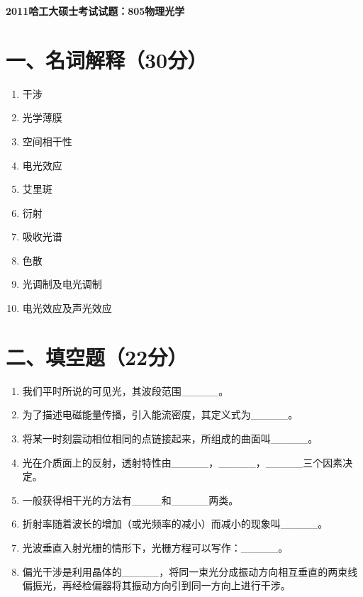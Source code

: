 \documentclass[12pt, a4paper]{article}
\theoremstyle{solution}
\begin{document}
\begin{center}
\Large\textbf{2011哈工大硕士考试试题：805物理光学}
\end{center}





\section*{一、名词解释（30分）}
\begin{enumerate}
    \item 干涉
    \item 光学薄膜
    \item 空间相干性
    \item 电光效应
    \item 艾里斑
    \item 衍射
    \item 吸收光谱
    \item 色散
    \item 光调制及电光调制
    \item 电光效应及声光效应
\end{enumerate}
\section*{二、填空题（22分）}
\begin{enumerate}
    \item 我们平时所说的可见光，其波段范围\_\_\_\_\_。
    \item 为了描述电磁能量传播，引入能流密度，其定义式为\_\_\_\_\_。
    \item 将某一时刻震动相位相同的点链接起来，所组成的曲面叫\_\_\_\_\_。
    \item 光在介质面上的反射，透射特性由\_\_\_\_\_，\_\_\_\_\_，\_\_\_\_\_三个因素决定。
    \item 一般获得相干光的方法有\_\_\_\_和\_\_\_\_\_两类。
    \item 折射率随着波长的增加（或光频率的减小）而减小的现象叫\_\_\_\_\_。
    \item 光波垂直入射光栅的情形下，光栅方程可以写作：\_\_\_\_\_。
    \item 偏光干涉是利用晶体的\_\_\_\_\_，将同一束光分成振动方向相互垂直的两束线偏振光，再经检偏器将其振动方向引到同一方向上进行干涉。
\end{enumerate}
\end{document}
